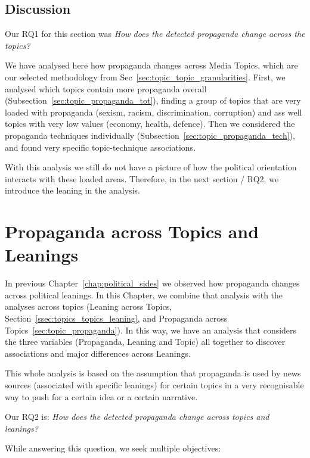 \subsection{\statusgreen Discussion}

Our RQ1 for this section was \emph{How does the detected propaganda change across the topics?}

We have analysed here how propaganda changes across Media Topics, which are our selected methodology from Sec~\ref{sec:topic_topic_granularities}.
First, we analysed which topics contain more propaganda overall (Subsection~\ref{sec:topic_propaganda_tot}), finding a group of topics that are very loaded with propaganda (sexism, racism, discrimination, corruption) and ass well topics with very low values (economy, health, defence).
Then we considered the propaganda techniques individually (Subsection~\ref{sec:topic_propaganda_tech}), and found very specific topic-technique associations.

With this analysis we still do not have a picture of how the political orientation interacts with these loaded areas. Therefore, in the next section / RQ2, we introduce the leaning in the analysis.



\section{\statusgreen Propaganda across Topics and Leanings}
\label{sec:topic_propaganda_leaning}

In previous Chapter~\ref{chap:political_sides} we observed how propaganda changes across political leanings.
In this Chapter, we combine that analysis with the analyses across topics (Leaning across Topics, Section~\ref{ssec:topics_topics_leaning}, and Propaganda across Topics~\ref{sec:topic_propaganda}).
In this way, we have an analysis that considers the three variables (Propaganda, Leaning and Topic) all together to discover associations and major differences across Leanings.

This whole analysis is based on the assumption that propaganda is used by news sources (associated with specific leanings) for certain topics in a very recognisable way to push for a certain idea or a certain narrative.

Our RQ2 is: \emph{How does the detected propaganda change across topics and leanings?}

While answering this question, we seek multiple objectives:

